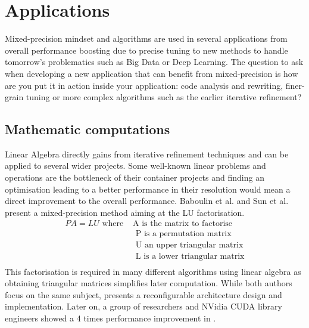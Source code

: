 \section{Applications}

Mixed-precision mindset and algorithms are used in several applications from overall performance boosting due to precise tuning to new methods to handle tomorrow's problematics such as Big Data or Deep Learning. The question to ask when developing a new application that can benefit from mixed-precision is how are you put it in action inside your application: code analysis and rewriting, finer-grain tuning or more complex algorithms such as the earlier iterative refinement?


\subsection{Mathematic computations}

Linear Algebra directly gains from iterative refinement techniques and can be applied to several wider projects. Some well-known linear problems and operations are the bottleneck of their container projects and finding an optimisation leading to a better performance in their resolution would mean a direct improvement to the overall performance. Baboulin et al. \cite{Baboulin2009} and Sun et al. \cite{Sun2008} present a mixed-precision method aiming at the LU factorisation.
\begin{align}
  PA=LU \textrm{ where } & \textrm{A is the matrix to factorise} \\
        & \textrm{ P is a permutation matrix} \\
        & \textrm{ U an upper triangular matrix} \\
        & \textrm{ L is a lower triangular matrix} \\
\end{align}
This factorisation is required in many different algorithms using linear algebra as obtaining triangular matrices simplifies later computation. While both authors focus on the same subject, \cite{Sun2008} presents a reconfigurable architecture design and implementation. Later on, a group of researchers and NVidia CUDA library engineers showed a 4 times performance improvement in \cite{Haidar2018}.


